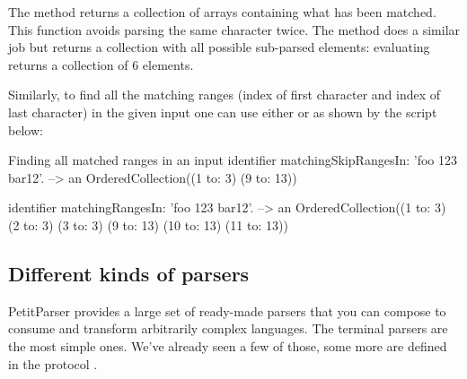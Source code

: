 \documentclass[a4paper,10pt,twoside]{book}
\begin{document}
The  method returns a collection of arrays
containing what has been matched. This function avoids parsing the
same character twice. The method  does a similar
job but returns a collection with all possible sub-parsed elements:
\eg{} evaluating  returns a
collection of 6 elements.

Similarly, to find all the matching ranges (index of first character
and index of last character) in the given input one can use either
 or  as
shown by the script below:

\begin{script}{Finding all matched ranges in an input}
identifier matchingSkipRangesIn: 'foo 123 bar12'.
 --> an OrderedCollection((1 to: 3) (9 to: 13))

identifier matchingRangesIn: 'foo 123 bar12'.
 --> an OrderedCollection((1 to: 3) (2 to: 3) (3 to: 3) (9 to: 13) (10 to: 13) (11 to: 13))
\end{script}

\subsection{Different kinds of parsers}

PetitParser provides a large set of ready-made parsers that you can
compose to consume and transform arbitrarily complex languages. The
terminal parsers are the most simple ones. We've already seen a few of
those, some more are defined in the protocol .
\end{document}
